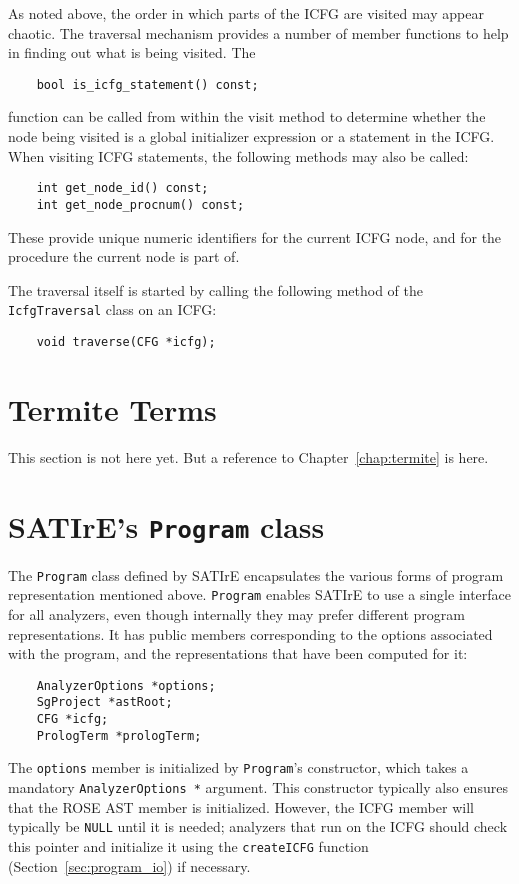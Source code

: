 \documentclass[a4paper,12pt]{report}
\begin{document}
As noted above, the order in which parts of the ICFG are visited may appear
chaotic. The traversal mechanism provides a number of member functions to
help in finding out what is being visited. The
\begin{verbatim}
    bool is_icfg_statement() const;
\end{verbatim}
function can be called from within the visit method to determine whether the
node being visited is a global initializer expression or a statement in the
ICFG. When visiting ICFG statements, the following methods may also be
called:
\begin{verbatim}
    int get_node_id() const;
    int get_node_procnum() const;
\end{verbatim}
These provide unique numeric identifiers for the current ICFG node, and for
the procedure the current node is part of.

The traversal itself is started by calling the following method of the
\texttt{IcfgTraversal} class on an ICFG:
\begin{verbatim}
    void traverse(CFG *icfg);
\end{verbatim}

\section{Termite Terms}
\label{sec:representation_termite}

This section is not here yet. But a reference to Chapter~\ref{chap:termite}
is here.

\section{SATIrE's \texttt{Program} class}
\label{sec:satire_program}

The \texttt{Program} class defined by SATIrE encapsulates the various forms
of program representation mentioned above. \texttt{Program} enables SATIrE
to use a single interface for all analyzers, even though internally they may
prefer different program representations. It has public members
corresponding to the options associated with the program, and the
representations that have been computed for it:
\begin{verbatim}
    AnalyzerOptions *options;
    SgProject *astRoot;
    CFG *icfg;
    PrologTerm *prologTerm;
\end{verbatim}

The \texttt{options} member is initialized by \texttt{Program}'s
constructor, which takes a mandatory \verb|AnalyzerOptions *| argument. This
constructor typically also ensures that the ROSE AST member is initialized.
However, the ICFG member will typically be \texttt{NULL} until it is needed;
analyzers that run on the ICFG should check this pointer and initialize it
using the \texttt{createICFG} function (Section~\ref{sec:program_io}) if
necessary.
\end{document}
